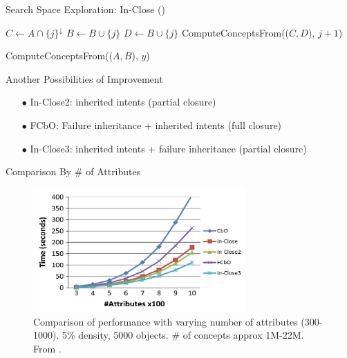 \documentclass[pdf,xcolor=table]{beamer}
\begin{document}
\begin{frame}[t]{Search Space Exploration: In-Close (\cite{Andrews2015})}
    \begin{algorithm}[H]
        \begin{algorithmic}[1]
                \STATE $C \leftarrow A \cap \{j\}^\downarrow$
                    \STATE $B \leftarrow B \cup \{j\}$
                \ELSE
                        \STATE $D \leftarrow B \cup \{j\}$
                        \STATE ComputeConceptsFrom(($C, D$), $j + 1$)
                    \ENDIF
                \ENDIF
            \ENDFOR
        \end{algorithmic}
        \caption{ComputeConceptsFrom(($A, B$), $y$)}
        \label{alg:inclose}
    \end{algorithm}
\end{frame}

\begin{frame}[t]{Another Possibilities of Improvement}
\begin{itemize}
    \item[$\bullet$] In-Close2: inherited intents (partial closure)
    \item[$\bullet$] FCbO: Failure inheritance + inherited intents (full closure)
    \item[$\bullet$] In-Close3: inherited intents + failure inheritance (partial closure)
\end{itemize}
\end{frame}

\begin{frame}[c]{Comparison By \# of Attributes}
    \begin{figure}
        \centering
        \includegraphics[width=230pt]{andrews_1.png}
        \caption{Comparison of performance with varying number of attributes (300-1000). 5\% density, 5000 objects. \# of concepts approx 1M-22M.
        From \cite{Andrews2015}.}
    \end{figure}
\end{frame}
\end{document}
